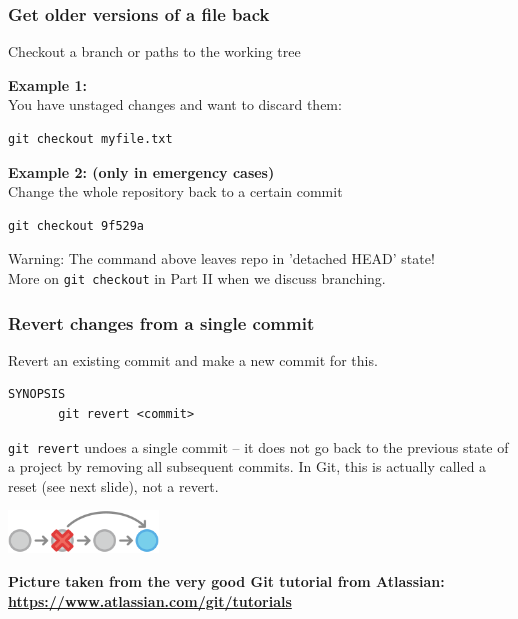 \documentclass{gittalk}
\newcommand{\hlcommand}[1]{ %
\colorbox{base3}{\small \texttt{#1}}
}
\begin{document}
\begin{frame}[fragile]
\frametitle{Get older versions of a file back}
\begin{tcolorbox}[title=git checkout]
Checkout a branch or paths to the working tree
\end{tcolorbox}
\vspace*{0.5em}
\textbf{Example 1:}\\
You have unstaged changes and want to discard them:\\[0.5em]
\begin{lstlisting}[basicstyle=\normalsize\ttfamily]
git checkout myfile.txt
\end{lstlisting}
\vspace*{0.5em}
\textbf{Example 2: (only in emergency cases)}\\
Change the whole repository back to a certain commit\\[0.5em]
\begin{lstlisting}[basicstyle=\normalsize\ttfamily]
git checkout 9f529a
\end{lstlisting}
Warning: The command above leaves repo in 'detached HEAD' state!\\
More on \hlcommand{git checkout} in Part II when we discuss branching.
\end{frame}


\begin{frame}[fragile]
\frametitle{Revert changes from a single commit}
\begin{tcolorbox}[title=git revert]
Revert an existing commit and make a new commit for this.
\begin{lstlisting}
SYNOPSIS
       git revert <commit>
\end{lstlisting}
\end{tcolorbox}

\vspace*{1em}
\texttt{git revert} undoes a single commit -- it does not go
back to the previous state of a project by removing all subsequent 
commits.
In Git, this is actually called a reset (see next slide), not a revert.
\begin{center}
\includegraphics[width=0.3\textwidth]{./img/git-tutorial_changes-revert}
\end{center}
{\footnotesize \textbf{Picture taken from the very good Git tutorial from Atlassian: \url{https://www.atlassian.com/git/tutorials}}}
\end{frame}
\end{document}
